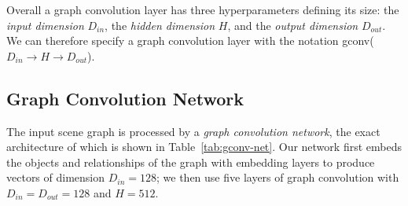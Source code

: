 \documentclass[10pt,twocolumn,letterpaper]{article}
\begin{document}
Overall a graph convolution layer has three hyperparameters defining its size: the \emph{input dimension} $D_{in}$, the \emph{hidden dimension} $H$, and the \emph{output dimension} $D_{out}$. We can therefore specify a graph convolution layer with the notation gconv($D_{in}\to H\to D_{out}$).

\begin{table}
  \centering
  \setlength{\tabcolsep}{1mm}
  \vspace{1mm}
  \caption{
    Network architecture for the second network $h$ used in graph convolution;
    this network implements a symmetric pooling function to convert the set of
    all candidate vectors for an object into a single output vector.
  }
  \label{tab:gconv-h}
\end{table}

\subsection{Graph Convolution Network}
The input scene graph is processed by a \emph{graph convolution network}, the
exact architecture of which is shown in Table~\ref{tab:gconv-net}. Our network
first embeds the objects and relationships of the graph with embedding layers to
produce vectors of dimension $D_{in}=128$; we then use five layers of graph convolution
with $D_{in}=D_{out}=128$ and $H=512$.
\end{document}
